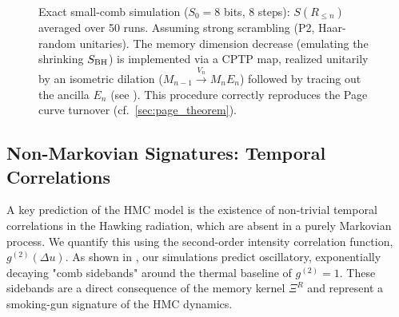 \documentclass[a4paper,11pt]{article}
\newcommand{\HMC}{\textup{\textsc{HMC}}\xspace}
\theoremstyle{plain}
\theoremstyle{definition}
\theoremstyle{remark}
\newcommand{\datatableExactComb}{}
\begin{document}
\begin{figure}[htbp]
    \centering
    \caption{Exact small-comb simulation ($S_0=8$ bits, 8 steps): $S(R_{\le n})$ averaged over 50 runs. Assuming strong scrambling (P2, Haar-random unitaries). The memory dimension decrease (emulating the shrinking $S_{\rm BH}$) is implemented via a CPTP map, realized unitarily by an isometric dilation ($M_{n-1}\xrightarrow{V_n} M_n E_n$) followed by tracing out the ancilla $E_n$ (see ). This procedure correctly reproduces the Page curve turnover (cf.~\cref{sec:page_theorem}).}
    \label{fig:page_curve_exact}
\end{figure}

\subsection{Non-Markovian Signatures: Temporal Correlations}
A key prediction of the \HMC{} model is the existence of non-trivial temporal correlations in the Hawking radiation, which are absent in a purely Markovian process. We quantify this using the second-order intensity correlation function, $g^{(2)}(\Delta u)$. As shown in , our simulations predict oscillatory, exponentially decaying "comb sidebands" around the thermal baseline of $g^{(2)}=1$. These sidebands are a direct consequence of the memory kernel $\Xi^R$ and represent a smoking-gun signature of the \HMC{} dynamics.
\end{document}
